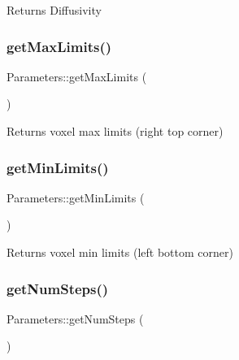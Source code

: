 \begin{DoxyReturn}{Returns}
Diffusivity 
\end{DoxyReturn}
\mbox{\label{class_parameters_ad4f8b826db4c1b665891740469e41086}} 
\subsubsection{\texorpdfstring{get\+Max\+Limits()}{getMaxLimits()}}
{\footnotesize\ttfamily Parameters\+::get\+Max\+Limits (\begin{DoxyParamCaption}{ }\end{DoxyParamCaption})}

\begin{DoxyReturn}{Returns}
voxel max limits (right top corner) 
\end{DoxyReturn}
\mbox{\label{class_parameters_abda8b91e5ac40e67c79184d7071c353a}} 
\subsubsection{\texorpdfstring{get\+Min\+Limits()}{getMinLimits()}}
{\footnotesize\ttfamily Parameters\+::get\+Min\+Limits (\begin{DoxyParamCaption}{ }\end{DoxyParamCaption})}

\begin{DoxyReturn}{Returns}
voxel min limits (left bottom corner) 
\end{DoxyReturn}
\mbox{\label{class_parameters_aa5aaf80e0189c63090e8f04cf485800f}} 
\subsubsection{\texorpdfstring{get\+Num\+Steps()}{getNumSteps()}}
{\footnotesize\ttfamily Parameters\+::get\+Num\+Steps (\begin{DoxyParamCaption}{ }\end{DoxyParamCaption})}

